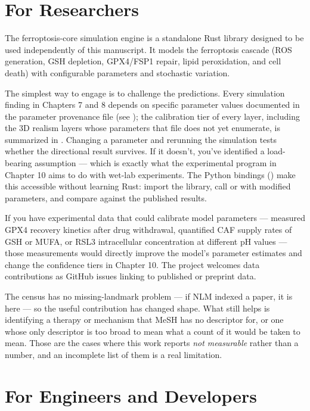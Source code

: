 \documentclass[11pt,twoside,openright]{report}
\begin{document}
\section{For Researchers}

The ferroptosis-core simulation engine is a standalone Rust library designed to be used independently of this manuscript. It models the ferroptosis cascade (ROS generation, GSH depletion, GPX4/FSP1 repair, lipid peroxidation, and cell death) with configurable parameters and stochastic variation.

The simplest way to engage is to challenge the predictions. Every simulation finding in Chapters 7 and 8 depends on specific parameter values documented in the parameter provenance file (see ); the calibration tier of every layer, including the 3D realism layers whose parameters that file does not yet enumerate, is summarized in . Changing a parameter and rerunning the simulation tests whether the directional result survives. If it doesn't, you've identified a load-bearing assumption --- which is exactly what the experimental program in Chapter 10 aims to do with wet-lab experiments. The Python bindings () make this accessible without learning Rust: import the library, call  or  with modified parameters, and compare against the published results.

If you have experimental data that could calibrate model parameters --- measured GPX4 recovery kinetics after drug withdrawal, quantified CAF supply rates of GSH or MUFA, or RSL3 intracellular concentration at different pH values --- those measurements would directly improve the model's parameter estimates and change the confidence tiers in Chapter 10. The project welcomes data contributions as GitHub issues linking to published or preprint data.

The census has no missing-landmark problem --- if NLM indexed a paper, it is here --- so the useful contribution has changed shape. What still helps is identifying a therapy or mechanism that MeSH has no descriptor for, or one whose only descriptor is too broad to mean what a count of it would be taken to mean. Those are the cases where this work reports \textit{not measurable} rather than a number, and an incomplete list of them is a real limitation.

\section{For Engineers and Developers}
\end{document}
